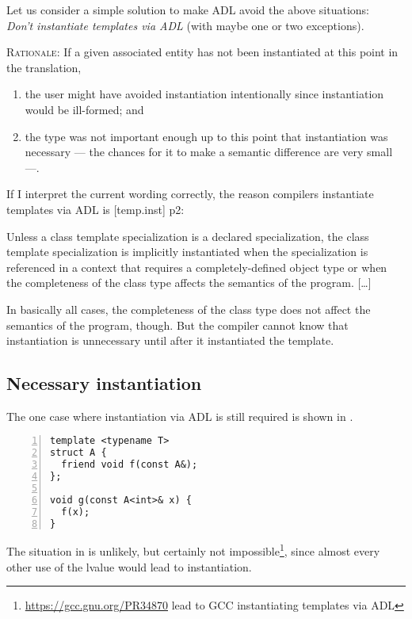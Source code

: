 Let us consider a simple solution to make ADL avoid the above situations:\\
\emph{Don't instantiate templates via ADL} (with maybe one or two exceptions).

\textsc{Rationale:} If a given associated entity has not been instantiated at this point 
in the translation,
\begin{enumerate}
\item the user might have avoided instantiation intentionally since instantiation would be 
ill-formed; and
\item the type was not important enough up to this point that instantiation was necessary 
--- the chances for it to make a semantic difference are very small ---.
\end{enumerate}

If I interpret the current wording correctly, the reason compilers instantiate templates 
via ADL is [temp.inst] p2:
\begin{wgText}

\setcounter{Paras}{1}
\pnum Unless a class template specialization is a declared specialization, the class 
template specialization is implicitly instantiated when the specialization is referenced 
in a context that requires a completely-defined object type or when the completeness of 
the class type affects the semantics of the program. [\ldots]

\end{wgText}
In basically all cases, the completeness of the class type does not affect the semantics 
of the program, though. But the compiler cannot know that instantiation is unnecessary 
until after it instantiated the template.


\subsection{Necessary instantiation}

The one case where instantiation via ADL is still required is shown in 
.
\begin{lstlisting}[style=Vc,numbers=left,float,label=lst:needsInstantiation,caption={
Requires instantiation or reasonable code could break.
}]
template <typename T>
struct A {
  friend void f(const A&);
};

void g(const A<int>& x) {
  f(x);
}
\end{lstlisting}
The situation in  is unlikely, but certainly not 
impossible\footnote{\url{https://gcc.gnu.org/PR34870} lead to GCC instantiating templates 
via ADL}, since almost every other use of the lvalue  would lead to instantiation.

